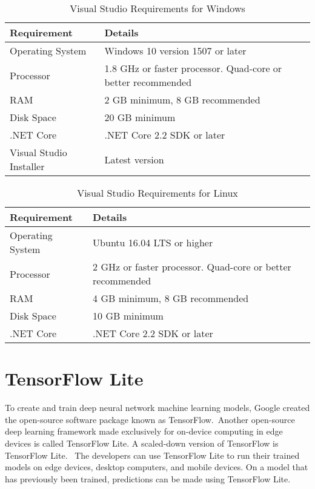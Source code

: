 \bigskip

\begin{table}[h]
	\centering
	\caption{Visual Studio Requirements for Windows}
	\label{tab:windows}
	\begin{tabular}{@{}ll@{}}
		\toprule
		Requirement & Details \\
		\midrule
		Operating System & Windows 10 version 1507 or later \\
		Processor & 1.8 GHz or faster processor. Quad-core or better recommended \\
		RAM & 2 GB minimum, 8 GB recommended \\
		Disk Space & 20 GB minimum \\
		.NET Core & .NET Core 2.2 SDK or later \\
		Visual Studio Installer & Latest version \\
		\bottomrule
	\end{tabular}
\end{table}

\bigskip

\begin{table}[h]
	\centering
	\caption{Visual Studio Requirements for Linux}
	\label{tab:linux}
	\begin{tabular}{@{}ll@{}}
		\toprule
		Requirement & Details \\
		\midrule
		Operating System & Ubuntu 16.04 LTS or higher \\
		Processor & 2 GHz or faster processor. Quad-core or better recommended \\
		RAM & 4 GB minimum, 8 GB recommended \\
		Disk Space & 10 GB minimum \\
		.NET Core & .NET Core 2.2 SDK or later \\
		\bottomrule
	\end{tabular}
\end{table}

\bigskip

\pagebreak

\section{TensorFlow Lite}


To create and train deep neural network machine learning models, Google created the open-source software package known as TensorFlow. Another open-source deep learning framework made exclusively for on-device computing in edge devices is called TensorFlow Lite. A scaled-down version of TensorFlow is TensorFlow Lite.  The developers can use TensorFlow Lite to run their trained models on edge devices, desktop computers, and mobile devices. On a model that has previously been trained, predictions can be made using TensorFlow Lite. \cite{Boesch:2022}

